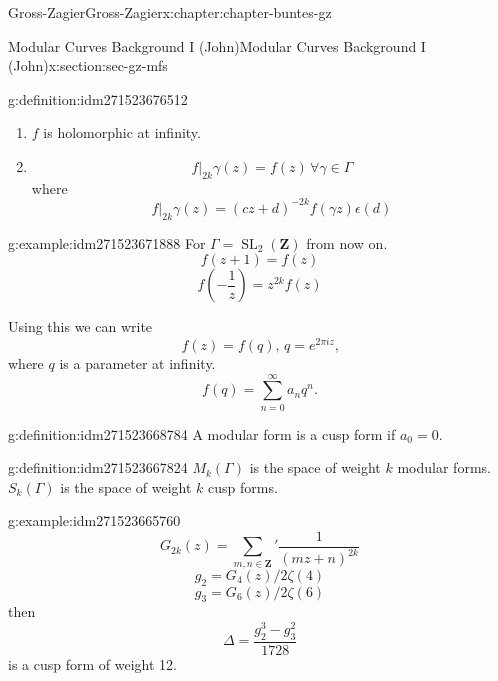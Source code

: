 \documentclass[oneside,10pt,]{book}
\numberwithin{equation}{section}
\newcommand{\ZZ}{\mathbf{Z}}
\DeclareMathOperator{\SL}{SL}
\begin{document}
\begin{chapterptx}{Gross-Zagier}{}{Gross-Zagier}{}{}{x:chapter:chapter-buntes-gz}
\begin{sectionptx}{Modular Curves Background I (John)}{}{Modular Curves Background I (John)}{}{}{x:section:sec-gz-mfs}
\begin{definition}{}{g:definition:idm271523676512}
\begin{enumerate}
\item{}\(f\) is holomorphic at infinity.%
\item{}%
\begin{equation*}
f|_{2k} \gamma (z) = f(z)\,\forall\gamma \in \Gamma 
\end{equation*}
where%
\begin{equation*}
f|_{2k} \gamma (z) = (cz+d)^{-2k}f(\gamma z)\epsilon (d)
\end{equation*}
%
\end{enumerate}
%
\end{definition}
\begin{example}{}{g:example:idm271523671888}%
For \(\Gamma =  \SL_2(\ZZ)\) from now on.%
\begin{equation*}
f(z+1) = f(z)
\end{equation*}
%
\begin{equation*}
f\left(-\frac 1z\right) = z^{2k}f(z)
\end{equation*}
%
\end{example}
Using this we can write%
\begin{equation*}
f(z) = f(q),\,q= e^{2\pi  i z}\text{,}
\end{equation*}
where \(q\) is a parameter at infinity.%
\begin{equation*}
f(q) = \sum_{n=0}^\infty a_n q^n\text{.}
\end{equation*}
%
\begin{definition}{}{g:definition:idm271523668784}%
A modular form is a cusp form if \(a_0 = 0\).%
\end{definition}
\begin{definition}{}{g:definition:idm271523667824}%
\(M_k(\Gamma )\) is the space of weight \(k\) modular forms. \(S_k(\Gamma )\) is the space of weight \(k\) cusp forms.%
\end{definition}
\begin{example}{}{g:example:idm271523665760}%
%
\begin{equation*}
G_{2k}(z) = \sum_{m,n\in \ZZ}' \frac{1}{(mz+n)^{2k}}
\end{equation*}
%
\begin{equation*}
g_{2} = G_4(z)/2\zeta (4)
\end{equation*}
%
\begin{equation*}
g_{3} = G_6(z)/2\zeta (6)
\end{equation*}
then%
\begin{equation*}
\Delta  = \frac{g_2^3 - g_3^2}{1728}
\end{equation*}
is a cusp form of weight 12.%

\end{example}
\end{sectionptx}
\end{chapterptx}
\end{document}
